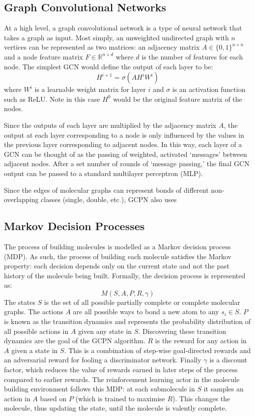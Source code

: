 \documentclass{article}
\begin{document}
\subsection{Graph Convolutional Networks}
At a high level, a graph convolutional network is a type of neural network that takes a graph as input. Most simply, an unweighted undirected graph with $n$ vertices can be represented as two matrices: an adjacency matrix $A\in \{0,1\}^{n\times n}$ and a node feature matrix $F\in\mathbb{R}^{n\times d}$ where $d$ is the number of features for each node. The simplest GCN would define the output of each layer to be:
\[H^{i+1}=\sigma\left( AH^iW^i \right)\]
where $W^i$ is a learnable weight matrix for layer $i$ and $\sigma$ is an activation function such as ReLU. Note in this case $H^0$ would be the original feature matrix of the nodes.

Since the outputs of each layer are multiplied by the adjacency matrix $A$, the output at each layer corresponding to a node is only influenced by the values in the previous layer corresponding to adjacent nodes. In this way, each layer of a GCN can be thought of as the passing of weighted, activated `messages' between adjacent nodes. After a set number of rounds of `message passing,' the final GCN output can be passed to a standard multilayer perceptron (MLP).

Since the edges of molecular graphs can represent bonds of different non-overlapping classes (single, double, etc.), GCPN also uses
\subsection{Markov Decision Processes}
The process of building molecules is modelled as a Markov decision process (MDP). As such, the process of building each molecule satisfies the Markov property: each decision depends only on the current state and not the past history of the molecule being built. Formally, the decision process is represented as:
\[M(S, A, P, R, \gamma)\]
The states $S$ is the set of all possible partially complete or complete molecular graphs. The actions $A$ are all possible ways to bond a new atom to any $s_i\in S$. $P$ is known as the transition dynamics and represents the probability distribution of all possible actions in $A$ given any state in $S$. Discovering these transition dynamics are the goal of the GCPN algorithm. $R$ is the reward for any action in $A$ given a state in $S$. This is a combination of step-wise goal-directed rewards and an adversarial reward for fooling a discriminator network. Finally $\gamma$ is a discount factor, which reduces the value of rewards earned in later steps of the process compared to earlier rewards. The reinforcement learning actor in the molecule building environment follows this MDP: at each submolecule in $S$ it samples an action in $A$ based on $P$ (which is trained to maximise $R$). This changes the molecule, thus updating the state, until the molecule is valently complete.
\end{document}
